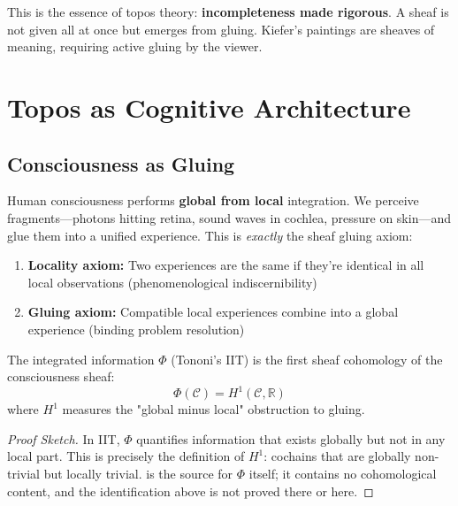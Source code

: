 This is the essence of topos theory: \textbf{incompleteness made rigorous}. A sheaf is not given all at once but emerges from gluing. Kiefer's paintings are sheaves of meaning, requiring active gluing by the viewer.

\section{Topos as Cognitive Architecture}

\subsection{Consciousness as Gluing}

Human consciousness performs \textbf{global from local} integration. We perceive fragments—photons hitting retina, sound waves in cochlea, pressure on skin—and glue them into a unified experience. This is \textit{exactly} the sheaf gluing axiom:

\begin{enumerate}
\item \textbf{Locality axiom:} Two experiences are the same if they're identical in all local observations (phenomenological indiscernibility)
\item \textbf{Gluing axiom:} Compatible local experiences combine into a global experience (binding problem resolution)
\end{enumerate}

\begin{theorem}
\label{thm:consciousness_cohomology}
The integrated information $\Phi$ (Tononi's IIT) is the first sheaf cohomology of the consciousness sheaf:
\begin{equation}
\Phi(\mathcal{C}) = H^1(\mathcal{C}, \mathbb{R})
\end{equation}
where $H^1$ measures the "global minus local" obstruction to gluing.
\end{theorem}

\begin{proof}[Proof Sketch]
In IIT, $\Phi$ quantifies information that exists globally but not in any local part. This is precisely the definition of $H^1$: cochains that are globally non-trivial but locally trivial. \cite{tononi2016} is the source for $\Phi$ itself; it contains no cohomological content, and the identification above is not proved there or here.
\end{proof}

